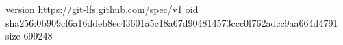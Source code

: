 version https://git-lfs.github.com/spec/v1
oid sha256:0b909cf6a16ddeb8ec43601a5c18a67d904814573ccc0f762adcc9aa664d4791
size 699248
